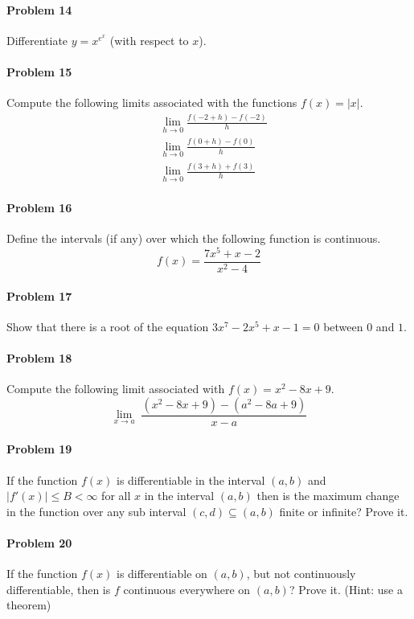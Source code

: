 \documentclass[a4paper, 11pt]{article}
\begin{document}
\paragraph{Problem 14} Differentiate $y = x^{e^x}$ (with respect to $x$).


\paragraph{Problem 15} Compute the following limits associated with the functions $f(x) = |x|$.
\begin{align}
    &\lim_{h\rightarrow 0} \frac{f(-2 + h) - f(-2)}{h}  \nonumber \\
    &\lim_{h\rightarrow 0} \frac{f(0 + h) - f(0)}{h} \nonumber \\
    &\lim_{h\rightarrow 0} \frac{f(3 + h) + f(3)}{h} \nonumber
\end{align}

\paragraph{Problem 16}
Define the intervals (if any) over which the following function is continuous.
\[
	f(x) = \frac{7x^5 + x - 2}{x^2-4}
\]


\paragraph{Problem 17}
Show that there is a root of the equation $3x^7 - 2x^5 + x -1 = 0$ between $0$ and $1$.


\paragraph{Problem 18}
Compute the following limit associated with $f(x) = x^2 - 8x + 9$.
\[
	\lim_{x\rightarrow a} \; \frac{(x^2-8x+9)-(a^2-8a+9)}{x-a}
\]


\paragraph{Problem 19}
If the function $f(x)$ is differentiable in the interval $(a,b)$ and $|f'(x)| \leq B < \infty$ for all $x$ in the interval $(a,b)$ then is the maximum change in the function over any sub interval $(c,d) \subseteq (a,b)$ finite or infinite? Prove it.

\paragraph{Problem 20}
If the function $f(x)$ is differentiable on $(a,b)$, but not continuously differentiable, then is $f$ continuous everywhere on $(a,b)$? Prove it. (Hint: use a theorem)
\end{document}
